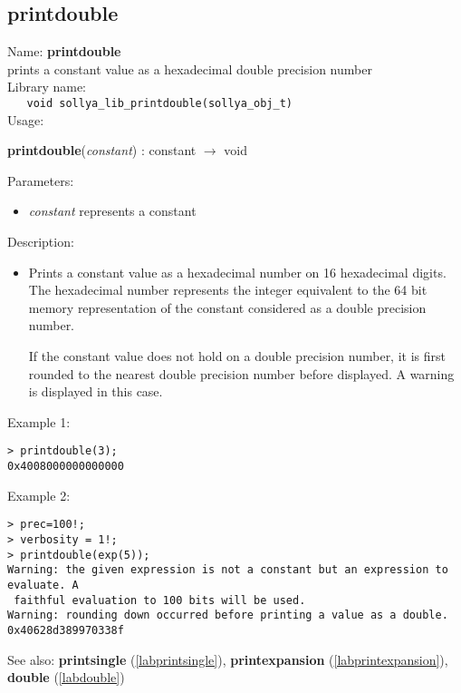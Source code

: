\subsection{printdouble}
\label{labprintdouble}
\noindent Name: \textbf{printdouble}\\
\phantom{aaa}prints a constant value as a hexadecimal double precision number\\[0.2cm]
\noindent Library name:\\
\verb|   void sollya_lib_printdouble(sollya_obj_t)|\\[0.2cm]
\noindent Usage: 
\begin{center}
\textbf{printdouble}(\emph{constant}) : \textsf{constant} $\rightarrow$ \textsf{void}\\
\end{center}
Parameters: 
\begin{itemize}
\item \emph{constant} represents a constant
\end{itemize}
\noindent Description: \begin{itemize}

\item Prints a constant value as a hexadecimal number on 16 hexadecimal
   digits. The hexadecimal number represents the integer equivalent to
   the 64 bit memory representation of the constant considered as a
   double precision number.
    
   If the constant value does not hold on a double precision number, it
   is first rounded to the nearest double precision number before
   displayed. A warning is displayed in this case.
\end{itemize}
\noindent Example 1: 
\begin{center}\begin{minipage}{15cm}\begin{Verbatim}[frame=single]
> printdouble(3);
0x4008000000000000
\end{Verbatim}
\end{minipage}\end{center}
\noindent Example 2: 
\begin{center}\begin{minipage}{15cm}\begin{Verbatim}[frame=single]
> prec=100!;
> verbosity = 1!;
> printdouble(exp(5));
Warning: the given expression is not a constant but an expression to evaluate. A
 faithful evaluation to 100 bits will be used.
Warning: rounding down occurred before printing a value as a double.
0x40628d389970338f
\end{Verbatim}
\end{minipage}\end{center}
See also: \textbf{printsingle} (\ref{labprintsingle}), \textbf{printexpansion} (\ref{labprintexpansion}), \textbf{double} (\ref{labdouble})
